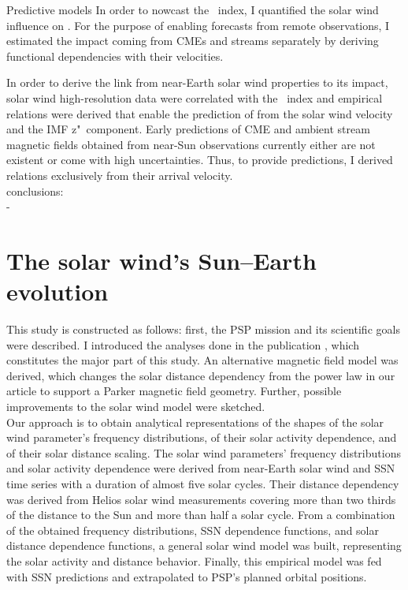 Predictive models
In order to nowcast the \Kp~index, I quantified the solar wind influence on \Kp{}.
For the purpose of enabling \Kp{} forecasts from remote observations, I estimated the \Kp{} impact coming from CMEs and streams separately by deriving functional dependencies with their velocities.

In order to derive the link from near-Earth solar wind properties to its \Kp{} impact, solar wind high-resolution data were correlated with the \Kp~index and empirical relations were derived that enable the prediction of \Kp{} from the solar wind velocity and the IMF z"~component. Early predictions of CME and ambient stream magnetic fields obtained from near-Sun observations currently either are not existent or come with high uncertainties. Thus, to provide \Kp{} predictions, I derived relations exclusively from their arrival velocity.\\


conclusions:\\
- \\


\section{The solar wind's Sun--Earth evolution}

This study is constructed as follows: first, the PSP mission and its scientific goals were described. I introduced the analyses done in the publication \citet{Venzmer2018}, which constitutes the major part of this study. An alternative magnetic field model was derived, which changes the solar distance dependency from the power law in our article to support a Parker magnetic field geometry. Further, possible improvements to the solar wind model were sketched.\\

Our approach is to obtain analytical representations of the shapes of the solar wind parameter’s frequency distributions, of their solar activity dependence, and of their solar distance scaling. The solar wind parameters’ frequency distributions and solar activity dependence were derived from near-Earth solar wind and SSN time series with a duration of almost five solar cycles. Their distance dependency was derived from Helios solar wind measurements covering more than two thirds of the distance to the Sun and more than half a solar cycle. From a combination of the obtained frequency distributions, SSN dependence functions, and solar distance dependence functions, a general solar wind model was built, representing the solar activity and distance behavior. Finally, this empirical model was fed with SSN predictions and extrapolated to PSP’s planned orbital positions.\\



